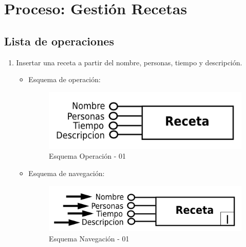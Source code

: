 \documentclass[a4paper,12pt]{report}
\begin{document}
\section{Proceso: Gestión Recetas}
\label{sec-7-4}
\subsection{Lista de operaciones}
\label{sec-7-4-1}
\begin{enumerate}
\item Insertar una receta a partir del nombre, personas, tiempo y
descripción.
\begin{itemize}
\item Esquema de operación:
\begin{figure}[!htp]
\centering
\includegraphics[width=0.5\linewidth]{./operaciones/img/Recetas/01_ope.png}
\caption{Esquema Operación - 01}
\label{fig:ope01}
\medskip
\footnotesize
{}
\end{figure}
\item Esquema de navegación:
\begin{figure}[!htp]
\centering
\includegraphics[width=0.5\linewidth]{./operaciones/img/Recetas/01_nav.png}
\caption{Esquema Navegación - 01}
\label{fig:nave01}
\medskip
\footnotesize
{}
\end{figure}
\end{itemize}


\end{enumerate}
\end{document}
